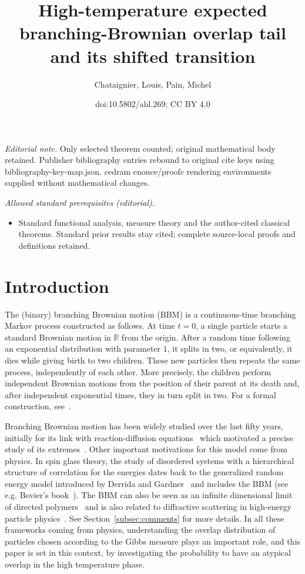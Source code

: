 \documentclass[10pt]{amsart}
\title{High-temperature expected branching-Brownian overlap tail and its shifted transition}
\author{Chataignier, Louis, Pain, Michel}
\date{doi:10.5802/ahl.269; CC BY 4.0}
\theoremstyle{definition}\newtheorem{defi}[theo]{Definition}\newtheorem{rema}[theo]{Remark}\newtheorem{exam}[theo]{Example}\newtheorem{exem}[theo]{Example}\newtheorem{nota}[theo]{Notation}
\newcommand{\R}{\mathbb{R}}
\newcommand\1{\mathds{1}}
\begin{document}
\maketitle
\noindent\textit{Editorial note.} Only selected theorem counted; original mathematical body retained. Publisher bibliography entries rebound to original cite keys using bibliography-key-map.json. cedram enonce/proofc rendering environments supplied without mathematical changes.\par\medskip
\noindent\textit{Allowed standard prerequisites (editorial).}\begin{itemize}
\item Standard functional analysis, measure theory and the author-cited classical theorems. Standard prior results stay cited; complete source-local proofs and definitions retained.
\end{itemize}\medskip

\tableofcontents

\section{Introduction}

The (binary) branching Brownian motion (BBM) is a continuous-time branching Markov process constructed as follows. At time $t = 0$, a single particle starts a standard Brownian motion in $\R$ from the origin. After a random time following an exponential distribution with parameter $1$, it splits in two, or equivalently, it dies while giving birth to two children. These new particles then repeats the same process, independently of each other. More precisely, the children perform independent Brownian motions from the position of their parent at its death and, after independent exponential times, they in turn split in two. For a formal construction, see~\cite{Chauvin1991}.

Branching Brownian motion has been widely studied over the last fifty years, initially for its link with reaction-diffusion equations~\cite{McKean1975} which motivated a precise study of its extremes~\cite{AidekonBerestyckiBrunetShi2013,ArguinBovierKistler2013,Bramson1978,Bramson1983,LalleySellke1987}. Other important motivations for this model come from physics. In spin glass theory, the study of disordered systems with a hierarchical structure of correlation for the energies dates back to the generalized random energy model introduced by Derrida and Gardner~\cite{DerridaGardner1986} and includes the BBM (see e.g. Bovier's book~\cite{Bovier2016}). The BBM can also be seen as an infinite dimensional limit of directed polymers~\cite{DerridaSpohn1988} and is also related to diffractive scattering in high-energy particle physics~\cite{Munier2009}. See Section~\ref{subsec:comments} for more details. In all these frameworks coming from physics, understanding the overlap distribution of particles chosen according to the Gibbs measure plays an important role, and this paper is set in this context, by investigating the probability to have an atypical overlap in the high temperature phase.
\end{document}
